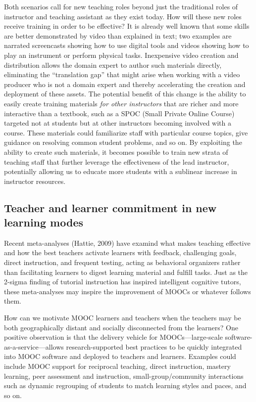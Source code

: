 Both scenarios call for new teaching roles beyond just the traditional
roles of instructor and teaching assistant as they exist today.
How will these new roles receive training in order to be effective?
It is already well known that some skills are better demonstrated by
video than explained in text; two examples are narrated screencasts
showing how to use digital tools and videos showing how to play an
instrument or perform physical tasks.
Inexpensive video creation and distribution allows the domain expert to
author such materials directly, eliminating the ``translation gap'' that
might arise when working with a video producer who is not a domain
expert and thereby accelerating the creation and deployment of these
assets.
The potential benefit of this change is the ability to easily create
training materials \emph{for other instructors} that are richer and more
interactive than a textbook, such as a
SPOC (Small Private Online Course) targeted not at students but at other
instructors becoming involved with a course.
These materials could familiarize staff with particular course topics,
give guidance on resolving common student problems, and so on.
By exploiting the ability to create such materials, it becomes possible
to train new strata of teaching staff that further leverage the
effectiveness of the lead instructor, potentially allowing us to educate
more students with a sublinear increase in instructor resources.

\subsection{Teacher and learner commitment in new learning modes}

Recent meta-analyses (Hattie, 2009) have examind what makes teaching
effective and how the best teachers activate learners with feedback,
challenging goals, direct instruction, and frequent testing, acting as
behavioral organizers rather than facilitating learners to digest
learning material and fulfill tasks.
Just as the 2-sigma finding of tutorial instruction has inspired
intelligent cognitive tutors, these meta-analyses may inspire the
improvement of MOOCs or
whatever follows them.

How can we motivate MOOC learners and teachers when the teachers may be
both geographically distant and socially disconnected from the learners?
One positive observation is that the delivery vehicle for
MOOCs---large-scale software-as-a-service---allows 
research-supported best practices to be quickly integrated into MOOC software
and deployed to teachers and learners.
Examples could include MOOC support for 
reciprocal teaching, direct instruction, mastery learning, peer
assessment and instruction,
small-group/community interactions such as dynamic regrouping of
students to match learning styles and paces, and so on.

